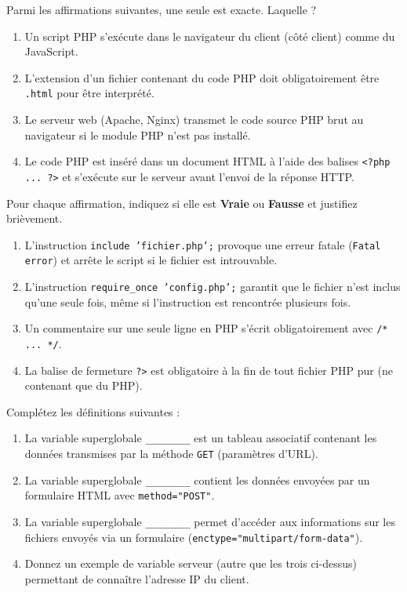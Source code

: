 \documentclass[11pt]{article}
\begin{document}
\begin{exercice}
Parmi les affirmations suivantes, une seule est exacte. Laquelle ?
\begin{enumerate}
    \item Un script PHP s'exécute dans le navigateur du client (côté client) comme du JavaScript.
    \item L'extension d'un fichier contenant du code PHP doit obligatoirement être \texttt{.html} pour être interprété.
    \item Le serveur web (Apache, Nginx) transmet le code source PHP brut au navigateur si le module PHP n'est pas installé.
    \item Le code PHP est inséré dans un document HTML à l'aide des balises \texttt{<?php ... ?>} et s'exécute sur le serveur avant l'envoi de la réponse HTTP.
\end{enumerate}
\end{exercice}

\begin{exercice}
Pour chaque affirmation, indiquez si elle est \textbf{Vraie} ou \textbf{Fausse} et justifiez brièvement.
\begin{enumerate}
    \item L'instruction \texttt{include 'fichier.php';} provoque une erreur fatale (\texttt{Fatal error}) et arrête le script si le fichier est introuvable.
    \item L'instruction \texttt{require\_once 'config.php';} garantit que le fichier n'est inclus qu'une seule fois, même si l'instruction est rencontrée plusieurs fois.
    \item Un commentaire sur une seule ligne en PHP s'écrit obligatoirement avec \texttt{/* ... */}.
    \item La balise de fermeture \texttt{?>} est obligatoire à la fin de tout fichier PHP pur (ne contenant que du PHP).
\end{enumerate}
\end{exercice}

\begin{exercice}
Complétez les définitions suivantes :
\begin{enumerate}
    \item La variable superglobale \texttt{\_\_\_\_\_\_\_\_} est un tableau associatif contenant les données transmises par la méthode \texttt{GET} (paramètres d'URL).
    \item La variable superglobale \texttt{\_\_\_\_\_\_\_\_} contient les données envoyées par un formulaire HTML avec \texttt{method="POST"}.
    \item La variable superglobale \texttt{\_\_\_\_\_\_\_\_} permet d'accéder aux informations sur les fichiers envoyés via un formulaire (\texttt{enctype="multipart/form-data"}).
    \item Donnez un exemple de variable serveur (autre que les trois ci-dessus) permettant de connaître l'adresse IP du client.
\end{enumerate}
\end{exercice}
\end{document}
